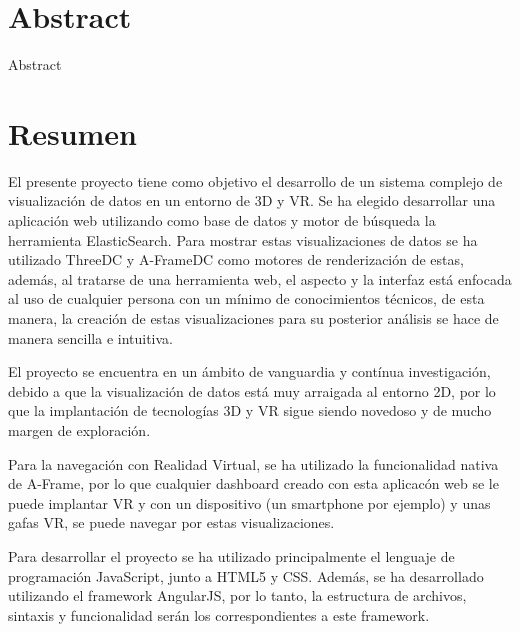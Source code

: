 \documentclass[a4paper, 12pt]{book}
\begin{document}

\chapter*{Abstract}
Abstract


\chapter*{Resumen}

El presente proyecto tiene como objetivo el desarrollo de un sistema complejo de visualización de datos en un entorno de 3D y VR. Se ha elegido desarrollar una aplicación web utilizando como base de datos y motor de búsqueda la herramienta ElasticSearch. Para mostrar estas visualizaciones de datos se ha utilizado ThreeDC y A-FrameDC como motores de renderización de estas, además, al tratarse de una herramienta web, el aspecto y la interfaz está enfocada al uso de cualquier persona con un mínimo de conocimientos técnicos, de esta manera, la creación de estas visualizaciones para su posterior análisis se hace de manera sencilla e intuitiva.

El proyecto se encuentra en un ámbito de vanguardia y contínua investigación, debido a que la visualización de datos está muy arraigada al entorno 2D, por lo que la implantación de tecnologías 3D y VR sigue siendo novedoso y de mucho margen de exploración.

Para la navegación con Realidad Virtual, se ha utilizado la funcionalidad nativa de A-Frame, por lo que cualquier dashboard creado con esta aplicacón web se le puede implantar VR y con un dispositivo (un smartphone por ejemplo) y unas gafas VR, se puede navegar por estas visualizaciones.

Para desarrollar el proyecto se ha utilizado principalmente el lenguaje de programación JavaScript, junto a HTML5 y CSS. Además, se ha desarrollado utilizando el framework AngularJS, por lo tanto, la estructura de archivos, sintaxis y funcionalidad serán los correspondientes a este framework.
\end{document}
